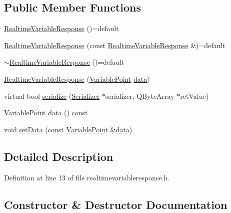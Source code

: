 \subsection*{Public Member Functions}
\begin{DoxyCompactItemize}
\item 
\hyperlink{class_a_h_p_1_1_realtime_variable_response_a4361c7d4b15aed094cb38774b061e448}{Realtime\+Variable\+Response} ()=default
\item 
\hyperlink{class_a_h_p_1_1_realtime_variable_response_a79b438fc780572f4f408aba627aec91b}{Realtime\+Variable\+Response} (const \hyperlink{class_a_h_p_1_1_realtime_variable_response}{Realtime\+Variable\+Response} \&)=default
\item 
\hyperlink{class_a_h_p_1_1_realtime_variable_response_affba3c329a6e1a79fd94e4ee49988a85}{$\sim$\+Realtime\+Variable\+Response} ()=default
\item 
\hyperlink{class_a_h_p_1_1_realtime_variable_response_a9867f3293e2f8dd284a541d27293691a}{Realtime\+Variable\+Response} (\hyperlink{class_variable_point}{Variable\+Point} \hyperlink{class_a_h_p_1_1_realtime_variable_response_a4b57ef706a7d287f86592dff2edaf714}{data})
\item 
virtual bool \hyperlink{class_a_h_p_1_1_realtime_variable_response_a4e71bb0a2f9826a29fa151da95e42ed2}{serialize} (\hyperlink{class_serializer}{Serializer} $\ast$serializer, Q\+Byte\+Array $\ast$ret\+Value)
\item 
\hyperlink{class_variable_point}{Variable\+Point} \hyperlink{class_a_h_p_1_1_realtime_variable_response_a4b57ef706a7d287f86592dff2edaf714}{data} () const 
\item 
void \hyperlink{class_a_h_p_1_1_realtime_variable_response_a9c92ff582201ba97064df7be745f5d58}{set\+Data} (const \hyperlink{class_variable_point}{Variable\+Point} \&\hyperlink{class_a_h_p_1_1_realtime_variable_response_a4b57ef706a7d287f86592dff2edaf714}{data})
\end{DoxyCompactItemize}


\subsection{Detailed Description}


Definition at line 13 of file realtimevariableresponse.\+h.



\subsection{Constructor \& Destructor Documentation}
\hypertarget{class_a_h_p_1_1_realtime_variable_response_a4361c7d4b15aed094cb38774b061e448}{}
